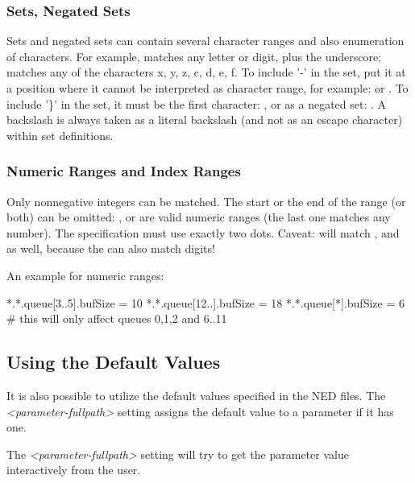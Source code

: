 \subsubsection{Sets, Negated Sets}
\label{sec:config-sim:sets-negated-sets}

Sets and negated sets can contain several character ranges and also
enumeration of characters. For example,  matches any letter
or digit, plus the underscore;  matches any of the characters
x, y, z, c, d, e, f.
To include '-' in the set, put it at a position where it cannot be
interpreted as character range, for example:  or .
To include '\}' in the set, it must be the first character: ,
or as a negated set: .
A backslash is always taken as a literal backslash (and not as an escape
character) within set definitions.


\subsubsection{Numeric Ranges and Index Ranges}
\label{sec:config-sim:numeric-ranges-and-index-ranges}

Only nonnegative integers can be matched.  The start or the end of the range
(or both) can be omitted: ,  or 
are valid numeric ranges (the last one matches any number).
The specification must use exactly two dots.
Caveat:  will match ,  and  as well,
because the \ttt{*} can also match digits!

An example for numeric ranges:

\begin{inifile}
[General]
*.*.queue[3..5].bufSize = 10
*.*.queue[12..].bufSize = 18
*.*.queue[*].bufSize = 6  # this will only affect queues 0,1,2 and 6..11
\end{inifile}


\subsection{Using the Default Values}
\label{sec:config-sim:using-default-values}

It is also possible to utilize the default values specified in the NED files.
The \textit{<parameter-fullpath>} setting assigns
the default value to a parameter if it has one.

The \textit{<parameter-fullpath>} setting will try to get the parameter
value interactively from the user.

